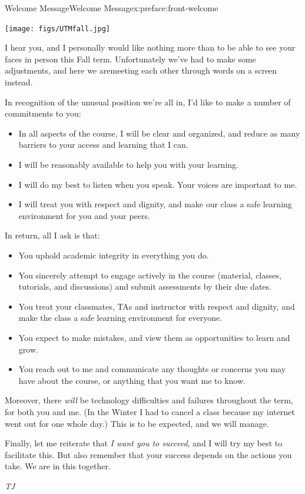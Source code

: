 \documentclass[oneside,10pt,]{book}
\numberwithin{equation}{section}
\begin{document}
\begin{preface}{Welcome Message}{}{Welcome Message}{}{}{x:preface:front-welcome}
\begin{sidebyside}{1}{0.15}{0.15}{0}%
\begin{sbspanel}{0.7}%
\texttt{[image: figs/UTMfall.jpg]}
\end{sbspanel}%
\end{sidebyside}%
\par
I hear you, and I personally would like nothing more than to be able to see your faces in person this Fall term. Unfortunately we've had to make some adjustments, and here we are\textemdash{}meeting each other through words on a screen instead.%
\par
In recognition of the unusual position we're all in, I'd like to make a number of commitments to you:%
\begin{itemize}[label=\textbullet]
\item{}In all aspects of the course, I will be clear and organized, and reduce as many barriers to your access and learning that I can.%
\item{}I will be reasonably available to help you with your learning.%
\item{}I will do my best to listen when you speak. Your voices are important to me.%
\item{}I will treat you with respect and dignity, and make our class a safe learning environment for you and your peers.%
\end{itemize}
In return, all I ask is that:%
\begin{itemize}[label=\textbullet]
\item{}You uphold academic integrity in everything you do.%
\item{}You sincerely attempt to engage actively in the course (material, classes, tutorials, and discussions) and submit assessments by their due dates.%
\item{}You treat your classmates, TAs and instructor with respect and dignity, and make the class a safe learning environment for everyone.%
\item{}You expect to make mistakes, and view them as opportunities to learn and grow.%
\item{}You reach out to me and communicate any thoughts or concerns you may have about the course, or anything that you want me to know.%
\end{itemize}
%
\par
Moreover, there \emph{will} be technology difficulties and failures throughout the term, for both you and me. (In the Winter I had to cancel a class because my internet went out for one whole day.) This is to be expected, and we will manage.%
\par
Finally, let me reiterate that \emph{I want you to succeed}, and I will try my best to facilitate this. But also remember that your success depends on the actions you take. We are in this together.%
\par
\emph{TJ}%
\end{preface}
\end{document}
